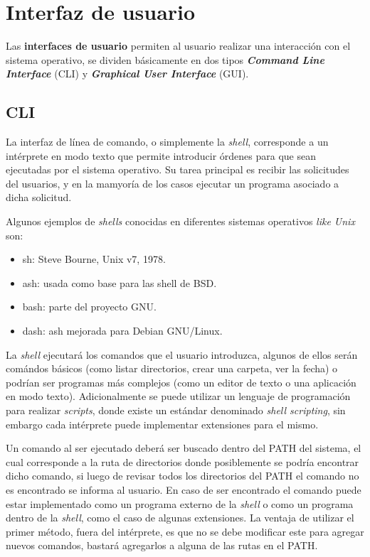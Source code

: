 \section{Interfaz de usuario}
Las \textbf{interfaces de usuario} permiten al usuario realizar una interacción
con el sistema operativo, se dividen básicamente en dos tipos
\textbf{\textit{Command Line Interface}} (CLI) y \textbf{\textit{Graphical User
Interface}} (GUI).

\subsection{CLI}
La interfaz de línea de comando, o simplemente la \textit{shell}, corresponde a
un intérprete en modo texto que permite introducir órdenes para que sean
ejecutadas por el sistema operativo. Su tarea principal es recibir las
solicitudes del usuarios, y en la mamyoría de los casos ejecutar un programa
asociado a dicha solicitud.

Algunos ejemplos de \textit{shells} conocidas en diferentes sistemas operativos
\textit{like Unix} son:

\begin{itemize}

	\item sh: Steve Bourne, Unix v7, 1978.

	\item ash: usada como base para las shell de BSD.

	\item bash: parte del proyecto GNU.

	\item dash: ash mejorada para Debian GNU/Linux.

\end{itemize}

La \textit{shell} ejecutará los comandos que el usuario introduzca, algunos de
ellos serán comándos básicos (como listar directorios, crear una carpeta, ver la
fecha) o podrían ser programas más complejos (como un editor de texto o una
aplicación en modo texto). Adicionalmente se puede utilizar un lenguaje de
programación para realizar \textit{scripts}, donde existe un estándar denominado
\textit{shell scripting}, sin embargo cada intérprete puede implementar
extensiones para el mismo.

Un comando al ser ejecutado deberá ser buscado dentro del PATH del sistema, el
cual corresponde a la ruta de directorios donde posiblemente se podría encontrar
dicho comando, si luego de revisar todos los directorios del PATH el comando no
es encontrado se informa al usuario. En caso de ser encontrado el comando puede
estar implementado como un programa externo de la \textit{shell} o como un
programa dentro de la \textit{shell}, como el caso de algunas extensiones. La
ventaja de utilizar el primer método, fuera del intérprete, es que no se debe
modificar este para agregar nuevos comandos, bastará agregarlos a alguna de las
rutas en el PATH.

